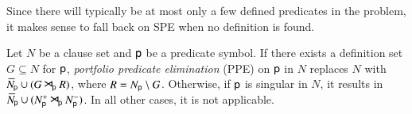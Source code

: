 Since there will typically be at most only a few defined predicates in the
problem, it makes sense to fall back on SPE when no definition is found.

\begin{defi}
   Let $N$ be a clause set and $\cst{p}$ be a predicate symbol. If there exists a
   definition set $G \subseteq N$ for $\cst{p}$, \emph{portfolio predicate
   elimination} (PPE) on $\cst{p}$ in $N$ replaces $N$ with
   $\withoutpred{N}{\cst{p}} \cup (\confrep{\withpred{G}{\cst{p}}}{G} \flatres_{\!\cst{p}}
   \confrep{\withpred{R}{\cst{p}}}{R})$, where $R = \withpred{N}{\cst{p}} \setminus G$.
   Otherwise, if $\cst{p}$ is singular in $N$, it results in $\withoutpred{N}{\cst{p}}
   \cup (\withpredpos{N}{\cst{p}} \flatres_{\!\cst{p}} \withpredneg{N}{\cst{p}})$.
   In all other cases, it is not applicable.
\end{defi}

